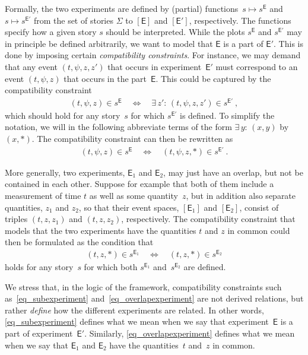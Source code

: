 \documentclass{article}
\theoremstyle{plain}
\theoremstyle{definition}
\newcommand*{\Exp}{\mathsf{E}}
\newcommand*{\Expp}{\mathsf{E'}}
\newcommand*{\Expone}{\mathsf{E}_1}
\newcommand*{\Exptwo}{\mathsf{E}_2}
\begin{document}
Formally,  the two experiments are defined by (partial) functions~$s \mapsto s^{\Exp}$ and  $s \mapsto s^{\Expp}$ from the set of stories $\Sigma$ to $[\Exp]$ and $[\Expp]$, respectively.  The functions specify how a given story $s$ should be interpreted. While the plots $s^{\Exp}$ and $s^{\Expp}$ may in principle be defined arbitrarily, we want to model that $\Exp$ is a part of $\Expp$. This is done by imposing certain \emph{compatibility constraints}. For instance, we may demand that any event $(t, \psi, z, z')$ that occurs in experiment~$\Expp$ must correspond to an event $(t, \psi, z)$ that occurs in the part~$\Exp$. This could be captured by the compatibility constraint
\begin{align*}  
  (t, \psi, z) \in s^{\Exp} \quad \iff \quad \exists \, z' : \, (t, \psi, z, z') \in s^{\Expp}  \ ,
\end{align*} 
which should hold for any story~$s$ for which $s^{\Expp}$ is defined.  To simplify the notation, we will in the following abbreviate terms of the form $\exists \, y : \, (x, y)$ by $(x, *)$. The compatibility constraint can then be rewritten as 
\begin{align} \label{eq_subexperiment}
  (t, \psi, z) \in s^{\Exp} \quad \iff \quad (t, \psi, z, *) \in s^{\Expp}  \ .
\end{align} 

More generally, two experiments, $\Expone$ and $\Exptwo$, may just have an overlap, but not be contained in each other. Suppose for example that both of them include a measurement of  time $t$ as well as some quantity~$z$, but in addition also separate quantities, $z_1$ and $z_2$, so that their event spaces, $[\Expone]$ and $[\Exptwo]$, consist of triples $(t, z, z_1)$ and $(t, z, z_2)$, respectively.  The compatibility constraint that models that the two experiments have the quantities $t$ and $z$ in common could then be formulated as the condition that
\begin{align} \label{eq_overlapexperiment}
  (t, z, *) \in s^{\Expone} \quad \iff \quad (t, z, *) \in s^{\Exptwo} 
\end{align} 
holds for any story~$s$ for which both $s^{\Expone}$ and~$s^{\Exptwo}$ are defined. 

We stress that, in the logic of the framework, compatibility constraints such as~\eqref{eq_subexperiment} and~\eqref{eq_overlapexperiment} are not derived relations, but rather \emph{define} how the different experiments are related. In other words, \eqref{eq_subexperiment} defines what we mean when we say that experiment~$\Exp$ is a part of experiment~$\Expp$. Similarly, \eqref{eq_overlapexperiment} defines what we mean when we say that $\Expone$ and $\Exptwo$ have the quantities~$t$ and~$z$ in common. 
\end{document}

